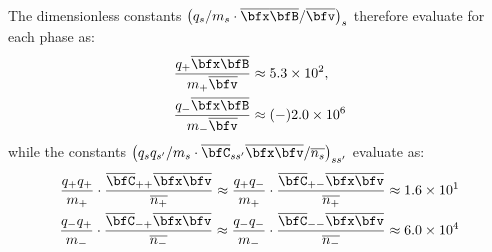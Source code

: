     The dimensionless constants $\left(q_{s}/m_{s}\cdot\overline{\bfx}\overline{\bfB}/\overline{\bfv}\right)_{s}$ therefore evaluate for each phase as:
    \begin{align}
        \frac{q_{+}\overline{\bfx}\overline{\bfB}}{m_{+}\overline{\bfv}}  &\approx  5.3\times 10^{2},   \\
        \frac{q_{-}\overline{\bfx}\overline{\bfB}}{m_{-}\overline{\bfv}}  &\approx  (-) 2.0\times 10^{6}
    \end{align}
    while the constants $\left(q_{s}q_{s'}/m_{s}\cdot\overline{\bfC}_{ss'}\overline{\bfx}\overline{\bfv}/\overline{n_{s}}\right)_{ss'}$ evaluate as:
    \begin{align}
        \frac{q_{+}q_{+}}{m_{+}}\cdot\frac{\overline{\bfC}_{++}\overline{\bfx}\overline{\bfv}}{\overline{n_{+}}}  \approx  \frac{q_{+}q_{-}}{m_{+}}\cdot\frac{\overline{\bfC}_{+-}\overline{\bfx}\overline{\bfv}}{\overline{n_{+}}}  &\approx  1.6\times 10^{1}  \\
        \frac{q_{-}q_{+}}{m_{-}}\cdot\frac{\overline{\bfC}_{-+}\overline{\bfx}\overline{\bfv}}{\overline{n_{-}}}  \approx  \frac{q_{-}q_{-}}{m_{-}}\cdot\frac{\overline{\bfC}_{--}\overline{\bfx}\overline{\bfv}}{\overline{n_{-}}}  &\approx   6.0\times 10^{4}
    \end{align}
    
